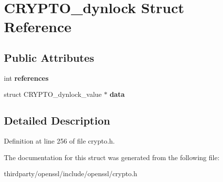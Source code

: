 \hypertarget{struct_c_r_y_p_t_o__dynlock}{}\section{C\+R\+Y\+P\+T\+O\+\_\+dynlock Struct Reference}
\label{struct_c_r_y_p_t_o__dynlock}
\subsection*{Public Attributes}
\begin{DoxyCompactItemize}
\item 
\mbox{\label{struct_c_r_y_p_t_o__dynlock_a5a29cc97b740faafbfc38aeb9b8e490d}} 
int {\bfseries references}
\item 
\mbox{\label{struct_c_r_y_p_t_o__dynlock_ac80047787eba227e04a56ec05ea5e0f2}} 
struct C\+R\+Y\+P\+T\+O\+\_\+dynlock\+\_\+value $\ast$ {\bfseries data}
\end{DoxyCompactItemize}


\subsection{Detailed Description}


Definition at line 256 of file crypto.\+h.



The documentation for this struct was generated from the following file\+:\begin{DoxyCompactItemize}
\item 
thirdparty/openssl/include/openssl/crypto.\+h\end{DoxyCompactItemize}
